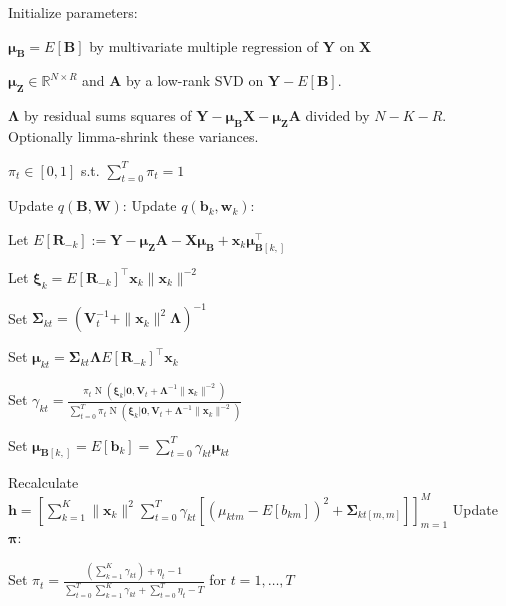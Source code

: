 \documentclass[11pt,authoryear]{article}
\DeclareMathOperator*{\N}{N}
\newcommand{\bs}[1]{\boldsymbol{#1}}
\begin{document}
\begin{algorithm}
\begin{algorithmic}
  \STATE Initialize parameters:
  \begin{description}
  \item $\bs{\mu}_{\bs{B}} = E[\bs{B}]$ by multivariate multiple regression of $\bs{Y}$ on $\bs{X}$
  \item $\bs{\mu}_{\bs{Z}} \in \mathbb{R}^{N \times R}$ and $\bs{A}$ by a low-rank SVD on $\bs{Y} - E[\bs{B}]$.
  \item $\bs{\Lambda}$ by residual sums squares of $\bs{Y} - \bs{\mu}_{\bs{B}}\bs{X} - \bs{\mu}_{\bs{Z}}\bs{A}$ divided by $N - K - R$. Optionally limma-shrink these variances.
  \item $\pi_t \in [0, 1]$ s.t. $\sum_{t = 0}^T\pi_t = 1$
  \end{description}
  \REPEAT
  \STATE Update $q(\bs{B},\bs{W})$:
  \STATE Update $q(\bs{b}_k,\bs{w}_k)$:
  \begin{description}
  \item Let $E[\bs{R}_{-k}] := \bs{Y} - \bs{\mu}_{\bs{Z}}\bs{A} - \bs{X}\bs{\mu}_{\bs{B}} + \bs{x}_k\bs{\mu}_{\bs{B}[k, ]}^{\intercal}$
  \item Let $\bs{\xi}_k = E\left[\bs{R}_{-k}\right]^{\intercal}\bs{x}_k\|\bs{x}_k\|^{-2}$
  \item Set $\bs{\Sigma}_{kt} = \left(\bs{V}_t^{-1} + \|\bs{x}_k\|^2\bs{\Lambda}\right)^{-1}$
  \item Set $\bs{\mu}_{kt} = \bs{\Sigma}_{kt}\bs{\Lambda}E\left[\bs{R}_{-k}\right]^{\intercal}\bs{x}_k$
  \item Set $\gamma_{kt} = \frac{\pi_t\N(\bs{\xi}_k|\bs{0}, \bs{V}_t + \bs{\Lambda}^{-1}\|\bs{x}_k\|^{-2})}{\sum_{t = 0}^T\pi_t\N(\bs{\xi}_k|\bs{0}, \bs{V}_t + \bs{\Lambda}^{-1}\|\bs{x}_k\|^{-2})}$
    \ENDFOR
  \item Set $\bs{\mu}_{\bs{B}[k, ]} = E[\bs{b}_{k}] = \sum_{t = 0}^T \gamma_{kt}\bs{\mu}_{kt}$
  \end{description}
  \ENDFOR
  \STATE Recalculate $\bs{h} = \left[\sum_{k = 1}^K\|\bs{x}_k\|^2\sum_{t = 0}^T\gamma_{kt}\left[\left(\mu_{ktm} - E[b_{km}]\right)^2 + \bs{\Sigma}_{kt[m, m]}\right]\right]_{m = 1}^{M}$
  \STATE Update $\bs{\pi}$:
  \begin{description}
  \item Set $\pi_t = \frac{\left(\sum_{k = 1}^K\gamma_{kt}\right) + \eta_t - 1}{\sum_{t = 0}^T\sum_{k = 1}^K\gamma_{kt} + \sum_{t = 0}^T\eta_t - T}$ for $t = 1,\ldots, T$

\end{description}
\end{algorithmic}
\end{algorithm}
\end{document}
